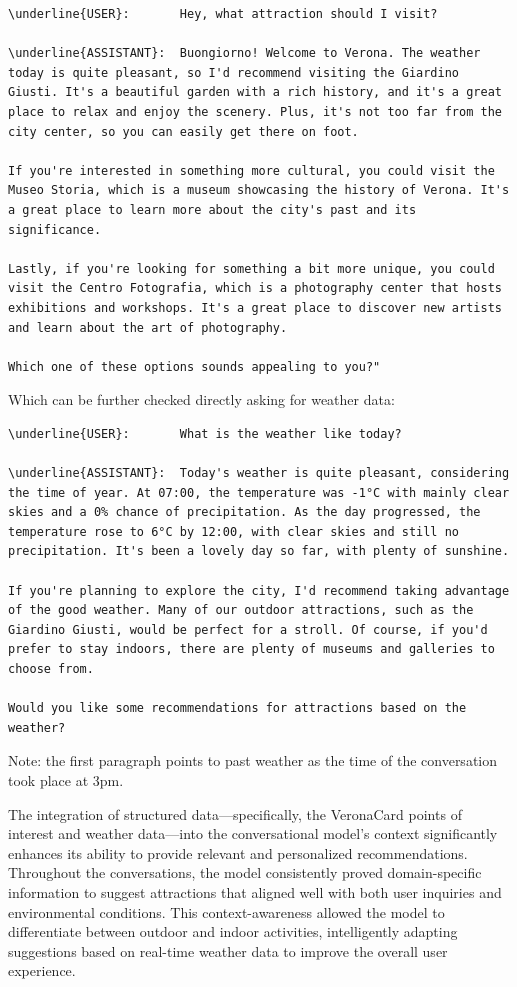 \begin{Verbatim}[breaklines=true]
\underline{USER}:       Hey, what attraction should I visit?

\underline{ASSISTANT}:  Buongiorno! Welcome to Verona. The weather today is quite pleasant, so I'd recommend visiting the Giardino Giusti. It's a beautiful garden with a rich history, and it's a great place to relax and enjoy the scenery. Plus, it's not too far from the city center, so you can easily get there on foot.

If you're interested in something more cultural, you could visit the Museo Storia, which is a museum showcasing the history of Verona. It's a great place to learn more about the city's past and its significance.

Lastly, if you're looking for something a bit more unique, you could visit the Centro Fotografia, which is a photography center that hosts exhibitions and workshops. It's a great place to discover new artists and learn about the art of photography.

Which one of these options sounds appealing to you?"
\end{Verbatim}

Which can be further checked directly asking for weather data:

\begin{Verbatim}[breaklines=true]
\underline{USER}:       What is the weather like today?

\underline{ASSISTANT}:  Today's weather is quite pleasant, considering the time of year. At 07:00, the temperature was -1°C with mainly clear skies and a 0% chance of precipitation. As the day progressed, the temperature rose to 6°C by 12:00, with clear skies and still no precipitation. It's been a lovely day so far, with plenty of sunshine.

If you're planning to explore the city, I'd recommend taking advantage of the good weather. Many of our outdoor attractions, such as the Giardino Giusti, would be perfect for a stroll. Of course, if you'd prefer to stay indoors, there are plenty of museums and galleries to choose from.

Would you like some recommendations for attractions based on the weather?
\end{Verbatim}

Note: the first paragraph points to past weather as the time of the conversation took place at 3pm.

The integration of structured data—specifically, the VeronaCard points of interest and weather data—into the conversational model's context significantly enhances its ability to provide relevant and personalized recommendations. Throughout the conversations, the model consistently proved domain-specific information to suggest attractions that aligned well with both user inquiries and environmental conditions. This context-awareness allowed the model to differentiate between outdoor and indoor activities, intelligently adapting suggestions based on real-time weather data to improve the overall user experience.


